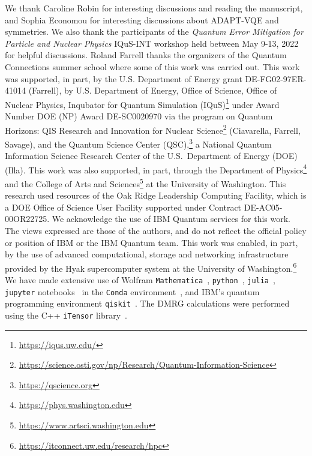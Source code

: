 \documentclass[aps, pra, onecolumn, tightenlines, letterpaper, amsmath, amssymb, preprintnumbers, floatfix, longbibliography, nofootinbib]{revtex4-2}
\begin{document}
\begin{acknowledgements}
\noindent
We thank Caroline Robin for interesting discussions and reading the manuscript,
and Sophia Economou for interesting discussions about ADAPT-VQE and symmetries.
We also thank the participants of the {\it Quantum Error Mitigation for Particle and Nuclear Physics} IQuS-INT workshop held between May 9-13, 2022 for helpful discussions.
Roland Farrell thanks the organizers of the Quantum Connections summer school where some of this work was carried out.
This work was supported, in part, by 
the U.S. Department of Energy grant DE-FG02-97ER-41014 (Farrell), 
by U.S. Department of Energy, Office of Science, Office of Nuclear Physics, Inqubator for Quantum Simulation (IQuS)\footnote{\url{https://iqus.uw.edu/}}
under Award Number DOE (NP) Award DE-SC0020970 
via the program on Quantum Horizons: QIS Research and Innovation for Nuclear Science\footnote{\url{https://science.osti.gov/np/Research/Quantum-Information-Science}}
(Ciavarella,  Farrell,  Savage), 
and the 
Quantum Science Center (QSC),\footnote{\url{https://qscience.org}} 
a National Quantum Information Science Research Center of the U.S.\ Department of Energy (DOE) (Illa).
This work was also supported, in part, through the Department of Physics\footnote{\url{https://phys.washington.edu}} 
and the College of Arts and Sciences\footnote{\url{https://www.artsci.washington.edu}}
at the University of Washington.
This research used resources of the Oak Ridge Leadership Computing Facility, 
which is a DOE Office of Science User Facility supported under Contract DE-AC05-00OR22725.
We acknowledge the use of IBM Quantum services for this work. The views expressed are those of the authors, and do not reflect the official policy or position of IBM or the IBM Quantum team. This work was enabled, in part, by the use of advanced computational, storage and networking infrastructure provided by the Hyak supercomputer system at the University of Washington.\footnote{\url{https://itconnect.uw.edu/research/hpc}}
We have made extensive use of Wolfram {\tt Mathematica}~\cite{Mathematica},
{\tt python}~\cite{python3,Hunter:2007}, {\tt julia}~\cite{Julia-2017},
{\tt jupyter} notebooks~\cite{PER-GRA:2007} 
in the {\tt Conda} environment~\cite{anaconda},
and IBM's quantum programming environment {\tt qiskit}~\cite{qiskit}. The DMRG calculations were performed using the C++ {\tt iTensor} library~\cite{fishman2022itensor}.
\end{acknowledgements}
\end{document}
